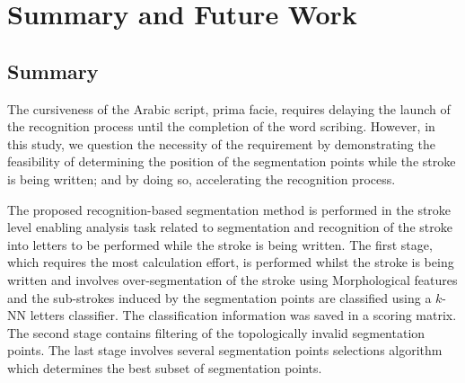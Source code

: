%
%
%

\chapter{Summary and Future Work}
\label{chap:summary}

\section{Summary}
\label{sec:summary}

The cursiveness of the Arabic script, prima facie, requires delaying the launch of the recognition process until the completion of the word scribing. 
However, in this study, we question the necessity of the requirement by demonstrating the feasibility of determining the position of the segmentation points while the stroke is being written; and by doing so, accelerating the recognition process.

The proposed recognition-based segmentation method is performed in the stroke level enabling analysis task related to segmentation and recognition of the stroke into letters to be performed while the stroke is being written. 
The first stage, which requires the most calculation effort, is performed whilst the stroke is being written and involves over-segmentation of the stroke using Morphological features and the sub-strokes induced by the segmentation points are classified using a $k$-NN letters classifier.
The classification information was saved in a scoring matrix.
The second stage contains filtering of the topologically invalid segmentation points. 
The last stage involves several segmentation points selections algorithm which determines the best subset of segmentation points.

